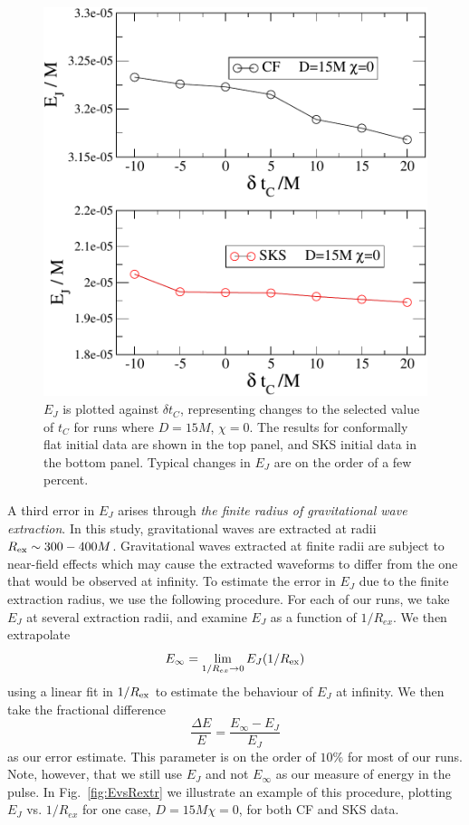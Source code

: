 \documentclass[aps,prd,amsmath,floatfix,twocolumn,superscriptaddress,nofootinbib,showpacs]{revtex4-1}
\theoremstyle{plain}
\theoremstyle{definition}
\begin{document}
\begin{figure}
 \includegraphics[width=0.95\columnwidth]{EvsDtj}
  \caption{$E_J$ is plotted against $\delta t_C$, representing changes
    to the selected value of $t_C$ for runs where $D=15M$,
    $\chi=0$. The results for conformally flat initial data are shown
    in the top panel, and SKS initial data in the bottom
    panel. Typical changes in $E_J$ are on the order of a few
    percent.}
 \label{fig:EvsDtC}
\end{figure}


A third error in $E_J$ arises through {\em the finite radius
    of gravitational wave extraction}.  In this study, gravitational waves are extracted at radii $R_{\rm ex}\sim 300-400M$.  Gravitational waves extracted at finite radii are subject to near-field effects which may cause the extracted
waveforms to differ from the one that would be observed at
infinity.  
To estimate the error in $E_J$ due to the finite extraction radius, we
use the following procedure. For each of our runs, we take $E_J$ at
several extraction radii, and examine $E_J$ as a function of
$1/R_{ex}$. We then extrapolate
\begin{equation}
E_{\infty} = \lim_{1/R_{ex}\rightarrow 0}E_J(1/R_{\rm ex})
\end{equation}
using a linear fit in $1/R_{\rm ex}$ to estimate the behaviour of $E_J$ at infinity. We
then take the fractional difference
\begin{equation}
\frac{\Delta E}{E} = \frac{E_{\infty}-E_J}{E_J}
\end{equation}
as our error estimate. This parameter is on the order of $10\%$ for
most of our runs. Note, however, that we still use $E_J$ and not $E_{\infty}$ as
our measure of energy in the pulse. In Fig.~\ref{fig:EvsRextr} we illustrate an
example of this procedure, plotting $E_J$ vs. $1/R_{ex}$ for one case,
$D=15M \chi=0$, for both CF and SKS data.
\end{document}

